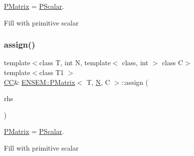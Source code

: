 \mbox{\hyperlink{classENSEM_1_1PMatrix}{P\+Matrix}} = \mbox{\hyperlink{classENSEM_1_1PScalar}{P\+Scalar}}. 

Fill with primitive scalar \mbox{\label{classENSEM_1_1PMatrix_aa9ba4e8c3935c0591c0b63daef8edaa5}} 
\subsubsection{\texorpdfstring{assign()}{assign()}\hspace{0.1cm}{\footnotesize\ttfamily [6/9]}}
{\footnotesize\ttfamily template$<$class T, int N, template$<$ class, int $>$ class C$>$ \\
template$<$class T1 $>$ \\
\mbox{\hyperlink{classENSEM_1_1PMatrix_a744bac549029029effe32dc1705660ec}{CC}}\& \mbox{\hyperlink{classENSEM_1_1PMatrix}{E\+N\+S\+E\+M\+::\+P\+Matrix}}$<$ T, \mbox{\hyperlink{adat__devel_2lib_2hadron_2operator__name__util_8cc_a7722c8ecbb62d99aee7ce68b1752f337}{N}}, C $>$\+::assign (\begin{DoxyParamCaption}\item[{const \mbox{\hyperlink{classENSEM_1_1PScalar}{P\+Scalar}}$<$ T1 $>$ \&}]{rhs }\end{DoxyParamCaption})\hspace{0.3cm}{\ttfamily [inline]}}



\mbox{\hyperlink{classENSEM_1_1PMatrix}{P\+Matrix}} = \mbox{\hyperlink{classENSEM_1_1PScalar}{P\+Scalar}}. 

Fill with primitive scalar \mbox{\label{classENSEM_1_1PMatrix_ac3c0e489c8c8011edc4ea93477176b84}} 
